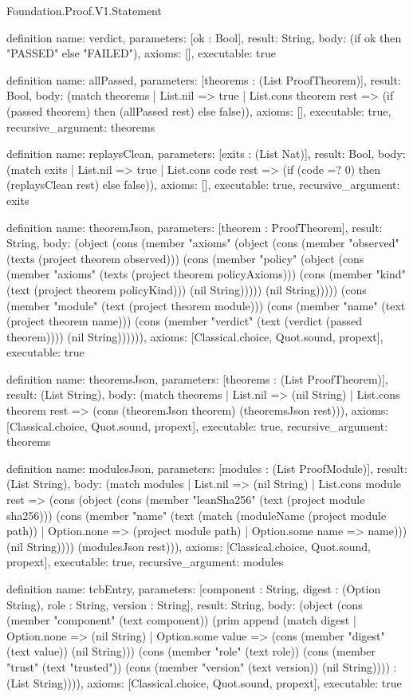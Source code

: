 \begin{lexlean}{Foundation.Proof.V1.Statement}
\begin{semanticmodule}
definition{
  name: verdict,
  parameters: [ok : Bool],
  result: String,
  body: (if ok then "PASSED" else "FAILED"),
  axioms: [],
  executable: true
}

definition{
  name: allPassed,
  parameters: [theorems : (List ProofTheorem)],
  result: Bool,
  body: (match theorems
    | List.nil => true
    | List.cons theorem rest => (if (passed theorem) then (allPassed rest) else false)),
  axioms: [],
  executable: true,
  recursive_argument: theorems
}

definition{
  name: replaysClean,
  parameters: [exits : (List Nat)],
  result: Bool,
  body: (match exits
    | List.nil => true
    | List.cons code rest => (if (code =? 0) then (replaysClean rest) else false)),
  axioms: [],
  executable: true,
  recursive_argument: exits
}

definition{
  name: theoremJson,
  parameters: [theorem : ProofTheorem],
  result: String,
  body: (object (cons (member "axioms" (object (cons (member "observed" (texts (project theorem observed))) (cons (member "policy" (object (cons (member "axioms" (texts (project theorem policyAxioms))) (cons (member "kind" (text (project theorem policyKind))) (nil String))))) (nil String))))) (cons (member "module" (text (project theorem module))) (cons (member "name" (text (project theorem name))) (cons (member "verdict" (text (verdict (passed theorem)))) (nil String)))))),
  axioms: [Classical.choice, Quot.sound, propext],
  executable: true
}

definition{
  name: theoremsJson,
  parameters: [theorems : (List ProofTheorem)],
  result: (List String),
  body: (match theorems
    | List.nil => (nil String)
    | List.cons theorem rest => (cons (theoremJson theorem) (theoremsJson rest))),
  axioms: [Classical.choice, Quot.sound, propext],
  executable: true,
  recursive_argument: theorems
}

definition{
  name: modulesJson,
  parameters: [modules : (List ProofModule)],
  result: (List String),
  body: (match modules
    | List.nil => (nil String)
    | List.cons module rest => (cons (object (cons (member "leanSha256" (text (project module sha256))) (cons (member "name" (text (match (moduleName (project module path))
      | Option.none => (project module path)
      | Option.some name => name))) (nil String)))) (modulesJson rest))),
  axioms: [Classical.choice, Quot.sound, propext],
  executable: true,
  recursive_argument: modules
}

definition{
  name: tcbEntry,
  parameters: [component : String, digest : (Option String), role : String, version : String],
  result: String,
  body: (object (cons (member "component" (text component)) (prim append (match digest
    | Option.none => (nil String)
    | Option.some value => (cons (member "digest" (text value)) (nil String))) (cons (member "role" (text role)) (cons (member "trust" (text "trusted")) (cons (member "version" (text version)) (nil String)))) : (List String)))),
  axioms: [Classical.choice, Quot.sound, propext],
  executable: true
}


\end{semanticmodule}
\end{lexlean}
